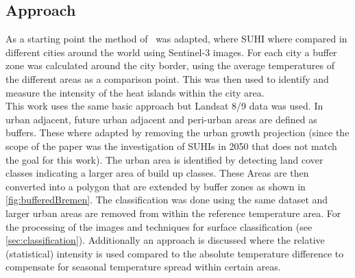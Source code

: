 \documentclass[12pt,a4paper, english,twoside]{article}
\begin{document}
    \subsection{Approach}
    As a starting point the method of~\cite{Sobrino2020} was adapted, where \gls{SUHI} where compared in different cities around the world using Sentinel-3 images. 
    For each city a buffer zone was calculated around the city border, using the average temperatures of the different areas as a comparison point.
    This was then used to identify and measure the intensity of the heat islands within the city area.\\ 
    This work uses the same basic approach but Landsat 8/9 data was used. 
    In~\cite{Sobrino2020} urban adjacent, future urban adjacent and peri-urban areas are defined as buffers.
    These where adapted by removing the urban growth projection (since the scope of the paper was the investigation of \glspl{SUHI} in 2050 that does not match the goal for this work).
    The urban area is identified by detecting land cover classes indicating a larger area of build up classes. 
    These Areas are then converted into a polygon that are extended by buffer zones as shown in \cref{fig:bufferedBremen}.
    The classification was done using the same dataset and larger urban areas are removed from within the reference temperature area. For the processing of the images and techniques for surface classification (see \cref{sec:classification}). 
    Additionally an approach is discussed where the relative (statistical) intensity is used compared to the absolute temperature difference to compensate for seasonal temperature spread within certain areas.
    \newpage
\end{document}
